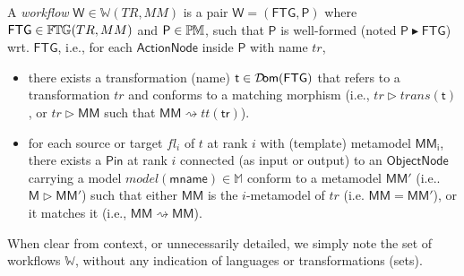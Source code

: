 \begin{Definition}
A \emph{workflow} $\mathsf{W}\in\mathbb{W}(TR, MM)$ is a pair $\mathsf{W} = 
(\mathsf{FTG}, \mathsf{P})$ where $\mathsf{FTG}\in\mathbb{F}\mskip-1mu\mathbb{T}\mskip-1mu\mathbb{G}(TR, MM)$ and 
$\mathsf{P}\in\mathbb{P}\mskip-1mu\mathbb{M}$, such that $\mathsf{P}$ is well-formed (noted 
$\mathsf{P} \blacktriangleright \mathsf{FTG}$) wrt. $\mathsf{FTG}$, i.e., for 
each $\mathsf{ActionNode}$ inside $\mathsf{P}$ with name 
$tr$,
\begin{itemize}
   \item there exists a transformation (name) $\mathsf{t}\in 
\mathsf{\mathcal{D}\!om}(\mathsf{FTG})$ 
that refers to a transformation $tr$ 
and conforms 
to a matching morphism (i.e.,
$tr \rhd trans(\mathsf{t})$, or $tr \rhd \mathsf{MM}$ such that $\mathsf{MM} 
\rightsquigarrow tt(\mathsf{tr})$).
  
   \item for each source or target $fl_i$ of $t$ at rank $i$ with (template) 
metamodel $\mathsf{MM_i}$, there exists a $\mathsf{Pin}$ at rank $i$ connected 
(as input or output) to an $\mathsf{ObjectNode}$ carrying a model 
$model(\mathsf{mname}) \in \mathbb{M}$ conform to a metamodel $\mathsf{MM'}$ 
(i.e.. $\mathsf{M} \rhd \mathsf{MM'}$) such that either $\mathsf{MM}$ is the 
$i$-metamodel of $tr$ (i.e. $\mathsf{MM} = \mathsf{MM'}$), or it matches it 
(i.e., $\mathsf{MM} \rightsquigarrow \mathsf{MM}$).

%       
\end{itemize}
\end{Definition}
\noindent
When clear from context, or unnecessarily detailed, we simply note the set of 
workflows $\mathbb{W}$, without any indication of languages or 
transformations (sets).

